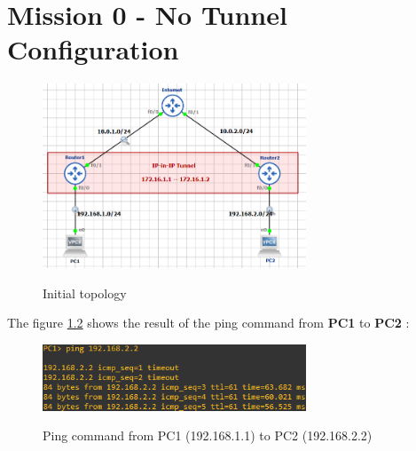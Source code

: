 \documentclass[10pt,a4paper]{ULBreport}
\begin{document}
 



\chapter{Mission 0 - No Tunnel Configuration}

\begin{figure}[H]
    \caption{Initial topology}
    \centering
    \includegraphics[width=0.7\textwidth]{Images/InitTopo.png}
    \label{initop}
\end{figure}




The figure \ref{fig:Images/Question_1_First_Pings_No_reply_2} shows the result of the ping command from \textbf{PC1} to \textbf{PC2} :

\begin{figure}[H]
    \caption{Ping command from PC1 (192.168.1.1) to PC2 (192.168.2.2)}
    \centering
    \includegraphics[width=0.7\textwidth]{Images/pingPC1PC2Commande.png}
    \label{fig:Images/Question_1_First_Pings_No_reply_2}
\end{figure}
\end{document}
